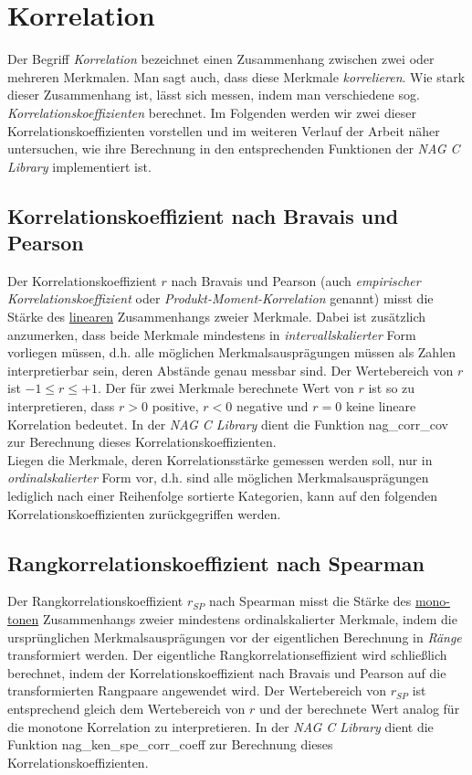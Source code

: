 \section{Korrelation}

Der Begriff {\it Korrelation} bezeichnet einen Zusammenhang zwischen zwei oder mehreren Merkmalen. Man sagt auch, dass diese Merkmale {\it korrelieren}. Wie stark dieser Zusammenhang ist, lässt sich messen, indem man verschiedene sog. {\it Korrelationskoeffizienten} berechnet. Im Folgenden werden wir zwei dieser Korrelationskoeffizienten vorstellen und im weiteren Verlauf der Arbeit näher untersuchen, wie ihre Berechnung in den entsprechenden Funktionen der {\it NAG C Library} implementiert ist.

\subsection{Korrelationskoeffizient nach Bravais und Pearson}

Der Korrelationskoeffizient $r$ nach Bravais und Pearson (auch {\it empirischer Korrelationskoeffizient} oder {\it Produkt-Moment-Korrelation} genannt) misst die Stärke des \underline{linearen} Zusammenhangs zweier Merkmale. Dabei ist zusätzlich anzumerken, dass beide Merkmale mindestens in {\it intervallskalierter} Form vorliegen müssen, d.h. alle möglichen Merkmalsausprägungen müssen als Zahlen interpretierbar sein, deren Abstände genau messbar sind. Der Wertebereich von $r$ ist $-1 \leq r \leq +1$. Der für zwei Merkmale berechnete Wert von $r$ ist so zu interpretieren, dass $r > 0$ positive, $r < 0$ negative und $r = 0$ keine lineare Korrelation bedeutet. In der {\it NAG C Library} dient die Funktion nag\_corr\_cov zur Berechnung dieses Korrelationskoeffizienten.\\
Liegen die Merkmale, deren Korrelationsstärke gemessen werden soll, nur in {\it ordinalskalierter} Form vor, d.h. sind alle möglichen Merkmalsausprägungen lediglich nach einer Reihenfolge sortierte Kategorien, kann auf den folgenden Korrelationskoeffizienten zurückgegriffen werden.

\subsection{Rangkorrelationskoeffizient nach Spearman}

Der Rangkorrelationskoeffizient $r_{SP}$ nach Spearman misst die Stärke des \underline{mono-}\\\underline{tonen} Zusammenhangs zweier mindestens ordinalskalierter Merkmale, indem die ursprünglichen Merkmalsausprägungen vor der eigentlichen Berechnung in {\it Ränge} transformiert werden. Der eigentliche Rangkorrelationseffizient wird schließlich berechnet, indem der Korrelationskoeffizient nach Bravais und Pearson auf die transformierten Rangpaare angewendet wird. Der Wertebereich von $r_{SP}$ ist entsprechend gleich dem Wertebereich von $r$ und der berechnete Wert analog für die monotone Korrelation zu interpretieren. In der {\it NAG C Library} dient die Funktion nag\_ken\_spe\_corr\_coeff zur Berechnung dieses Korrelationskoeffizienten.


